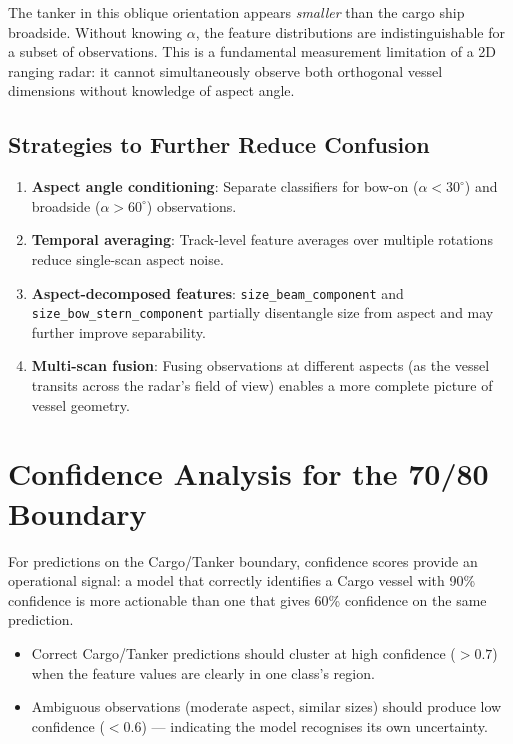 \documentclass[journal]{IEEEtran}
\begin{document}
The tanker in this oblique orientation appears \emph{smaller} than the cargo ship
broadside. Without knowing $\alpha$, the feature distributions are
indistinguishable for a subset of observations. This is a fundamental measurement
limitation of a 2D ranging radar: it cannot simultaneously observe both
orthogonal vessel dimensions without knowledge of aspect angle.

\subsection{Strategies to Further Reduce Confusion}

\begin{enumerate}
  \item \textbf{Aspect angle conditioning}: Separate classifiers for bow-on
        ($\alpha < 30^\circ$) and broadside ($\alpha > 60^\circ$) observations.
  \item \textbf{Temporal averaging}: Track-level feature averages over multiple
        rotations reduce single-scan aspect noise.
  \item \textbf{Aspect-decomposed features}: \texttt{size\_beam\_component} and
        \texttt{size\_bow\_stern\_component} partially disentangle size from
        aspect and may further improve separability.
  \item \textbf{Multi-scan fusion}: Fusing observations at different aspects
        (as the vessel transits across the radar's field of view) enables
        a more complete picture of vessel geometry.
\end{enumerate}

\section{Confidence Analysis for the 70/80 Boundary}
\label{sec:confidence}

For predictions on the Cargo/Tanker boundary, confidence scores provide an
operational signal: a model that correctly identifies a Cargo vessel with 90\%
confidence is more actionable than one that gives 60\% confidence on the same
prediction.

\begin{itemize}
  \item Correct Cargo/Tanker predictions should cluster at high confidence
        ($> 0.7$) when the feature values are clearly in one class's region.
  \item Ambiguous observations (moderate aspect, similar sizes) should produce
        low confidence ($< 0.6$) — indicating the model recognises its own
        uncertainty.
\end{itemize}
\end{document}
